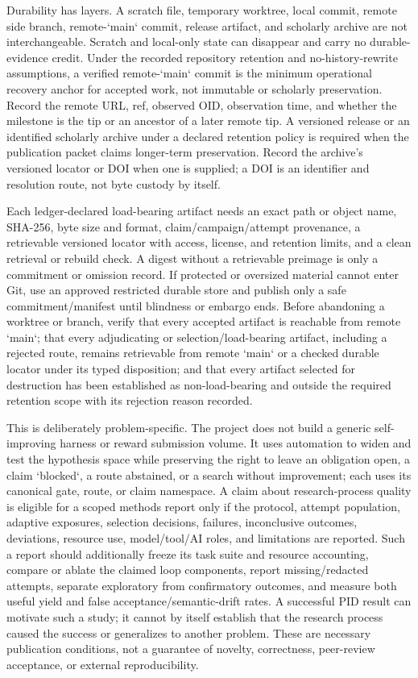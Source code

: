 \documentclass[11pt]{article}
\begin{document}
\begin{markdown}
Durability has layers. A scratch file, temporary worktree, local commit, remote side branch,
remote-`main` commit, release artifact, and scholarly archive are not interchangeable. Scratch and
local-only state can disappear and carry no durable-evidence credit. Under the recorded repository
retention and no-history-rewrite assumptions, a verified remote-`main` commit is the minimum
operational recovery anchor for accepted work, not immutable or scholarly preservation. Record the
remote URL, ref, observed OID, observation time, and whether the milestone is the tip or an ancestor
of a later remote tip. A versioned release or an identified scholarly archive under a declared
retention policy is required when the publication packet claims longer-term preservation. Record
the archive's versioned locator or DOI when one is supplied; a DOI is an identifier and resolution
route, not byte custody by itself.

Each ledger-declared load-bearing artifact needs an exact path or object name, SHA-256, byte size and
format, claim/campaign/attempt provenance, a retrievable versioned locator with access, license, and
retention limits, and a clean retrieval or rebuild check. A digest without a retrievable preimage is
only a commitment or omission record. If protected or oversized material cannot enter Git, use an
approved restricted durable store and publish only a safe commitment/manifest until blindness or
embargo ends. Before abandoning a worktree or branch, verify that every accepted artifact is
reachable from remote `main`; that every adjudicating or selection/load-bearing artifact, including
a rejected route, remains retrievable from remote `main` or a checked durable locator under its
typed disposition; and that every artifact selected for destruction has been established as
non-load-bearing and outside the required retention scope with its rejection reason recorded.

This is deliberately problem-specific. The project does not build a generic self-improving harness
or reward submission volume. It uses automation to widen and test the hypothesis space while
preserving the right to leave an obligation open, a claim `blocked`, a route abstained, or a search
without improvement; each uses its canonical gate, route, or claim namespace. A claim about
research-process quality is eligible for a scoped methods report only if the protocol, attempt
population, adaptive exposures, selection decisions, failures, inconclusive outcomes, deviations,
resource use, model/tool/AI roles, and limitations are reported. Such a report should additionally
freeze its task suite and resource accounting, compare or ablate the claimed loop components,
report missing/redacted attempts, separate exploratory from confirmatory outcomes, and measure both
useful yield and false acceptance/semantic-drift rates. A successful PID result can motivate such a
study; it cannot by itself establish that the research process caused the success or generalizes to
another problem. These are necessary publication conditions, not a guarantee of novelty,
correctness, peer-review acceptance, or external reproducibility.


\end{markdown}
\end{document}
